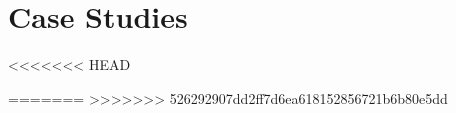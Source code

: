 
\chapter{Case Studies}


<<<<<<< HEAD



=======
>>>>>>> 526292907dd2ff7d6ea618152856721b6b80e5dd


